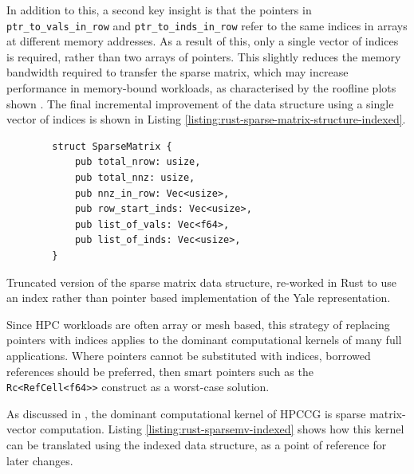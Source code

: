 In addition to this, a second key insight is that the pointers in \texttt{ptr_to_vals_in_row} and \texttt{ptr_to_inds_in_row} refer to the same indices in arrays at different memory addresses. As a result of this, only a single vector of indices is required, rather than two arrays of pointers. This slightly reduces the memory bandwidth required to transfer the sparse matrix, which may increase performance in memory-bound workloads, as characterised by the roofline plots shown . The final incremental improvement of the data structure using a single vector of indices is shown in Listing \ref{listing:rust-sparse-matrix-structure-indexed}.

\begin{listing}[H]
    \begin{verbatim}
        struct SparseMatrix {
            pub total_nrow: usize,
            pub total_nnz: usize,
            pub nnz_in_row: Vec<usize>,
            pub row_start_inds: Vec<usize>,
            pub list_of_vals: Vec<f64>,
            pub list_of_inds: Vec<usize>,
        }
    \end{verbatim}
    \caption{Truncated version of the sparse matrix data structure, re-worked in Rust to use an index rather than pointer based implementation of the Yale representation.}
    \label{listing:rust-sparse-matrix-structure-indexed}
\end{listing}

Since \acrshort{HPC} workloads are often array or mesh based, this strategy of replacing pointers with indices applies to the dominant computational kernels of many full applications. Where pointers cannot be substituted with indices, borrowed references should be preferred, then smart pointers such as the \texttt{Rc<RefCell<f64>>} construct as a worst-case solution.

As discussed in , the dominant computational kernel of \acrshort{HPCCG} is sparse matrix-vector computation. Listing \ref{listing:rust-sparsemv-indexed} shows how this kernel can be translated using the indexed data structure, as a point of reference for later changes.

